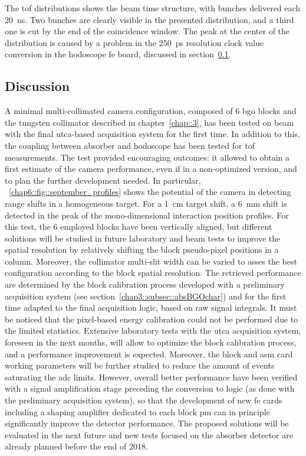 The \gls{tof} distributions shows the beam time structure, with bunches delivered each 20~ns. Two bunches are clearly visible in the presented distribution, and a third one is cut by the end of the coincidence window. The peak at the center of the distribution is caused by a problem in the 250~ps resolution clock value conversion in the hodoscope \gls{fe} board, discussed in section~\ref{chap6::subsec::septemberDiscussion}.  

\subsection{Discussion}\label{chap6::subsec::septemberDiscussion} 

A minimal multi-collimated camera configuration, composed of 6 \gls{bgo} blocks and the tungsten collimator described in chapter~\ref{chap::3}, has been tested on beam with the final \gls{utca}-based acquisition system for the first time. In addition to this, the coupling between absorber and hodoscope has been tested for \gls{tof} measurements. 
The test provided encouraging outcomes: it allowed to obtain a first estimate of the camera performance, even if in a non-optimized version, and to plan the further development needed. 
In particular, \figurename~\ref{chap6::fig::september_profiles} shows the potential of the camera in detecting range shifts in a homogeneous target. For a 1~cm target shift, a 6~mm shift is detected in the peak of the mono-dimensional interaction position profiles. For this test, the 6 employed blocks have been vertically aligned, but different solutions will be studied in future laboratory and beam tests to improve the spatial resolution by relatively shifting the block pseudo-pixel positions in a column. Moreover, the collimator multi-slit width can be varied to asses the best configuration according to the block spatial resolution. 
The retrieved performance are determined by the block calibration process developed with a preliminary acquisition system (see section~\ref{chap3::subsec::absBGOchar}) and for the first time adapted to the final acquisition logic, based on raw signal integrals. 
It must be noticed that the pixel-based energy calibration could not be performed due to the limited statistics. Extensive laboratory tests with the \gls{utca} acquisition system, foreseen in the next months, will allow to optimize the block calibration process, and a performance improvement is expected. Moreover, the block and \gls{asm} card working parameters will be further studied to reduce the amount of events saturating the \gls{adc} limits. However, overall better performance have been verified with a signal amplification stage preceding the conversion to logic (as done with the preliminary acquisition system), so that the development of new \gls{fe} cards including a shaping amplifier dedicated to each block \gls{pm} can in principle significantly improve the detector performance. The proposed solutions will be evaluated in the next future and new tests focused on the absorber detector are already planned before the end of 2018. 
